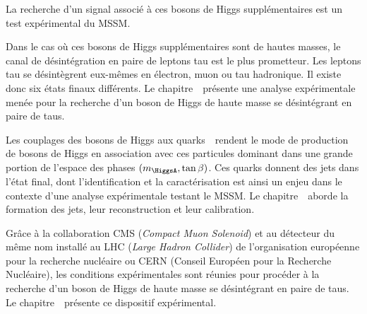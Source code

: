 La recherche d'un signal associé à ces bosons de Higgs supplémentaires est un test expérimental du MSSM.
\par Dans le cas où ces bosons de Higgs supplémentaires sont de hautes masses, le canal de désintégration en paire de leptons tau est le plus prometteur.
Les leptons tau se désintègrent eux-mêmes en électron, muon ou tau hadronique.
Il existe donc six états finaux différents.
Le chapitre~\ présente une analyse expérimentale menée pour la recherche d'un boson de Higgs de haute masse se désintégrant en paire de taus.
\par Les couplages des bosons de Higgs aux quarks~\quarkb\ rendent le mode de production de bosons de Higgs en association avec ces particules dominant dans une grande portion de l'espace des phases $(m_{\HiggsA}, \tan\beta)$.
Ces quarks donnent des jets dans l'état final, dont l'identification et la caractérisation est ainsi un enjeu dans le contexte d'une analyse expérimentale testant le MSSM.
Le chapitre~\ aborde la formation des jets, leur reconstruction et leur calibration.
\par Grâce à la collaboration CMS (\emph{Compact Muon Solenoid}) et au détecteur du même nom installé au LHC (\emph{Large Hadron Collider}) de l'organisation européenne pour la recherche nucléaire ou CERN (Conseil Européen pour la Recherche Nucléaire), les conditions expérimentales sont réunies pour procéder à la
recherche d'un boson de Higgs de haute masse se désintégrant en paire de taus.
Le chapitre~\ présente ce dispositif expérimental.